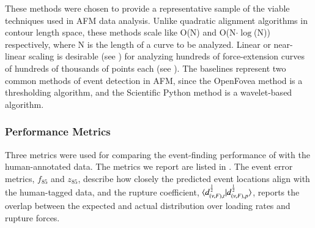  These methods were chosen to provide a representative sample of the viable techniques used in AFM data analysis. Unlike quadratic alignment algorithms in contour length space, these methods scale like O(N) and O(N$\cdot\log$(N)) respectively, where N is the length of a curve to be analyzed. Linear or near-linear scaling is desirable (see ) for analyzing hundreds of force-extension curves of hundreds of thousands of points each (see ). The baselines represent two common methods of event detection in AFM, since the OpenFovea method is a thresholding algorithm, and the Scientific Python method is a wavelet-based algorithm. \pl

\subsubsection{Performance Metrics}

\firstp Three metrics were used for comparing the event-finding performance of \name{} with the human-annotated data. The metrics we report are listed in . The event error metrics, $f_{85}$ and $z_{85}$, describe how closely the predicted event locations align with the human-tagged data, and the rupture \bc{} coefficient, $\braket{d_{(\nu,F),t}^{\frac{1}{2}}|d_{(\nu,F),p}^{\frac{1}{2}}}$, reports the overlap between the expected and actual distribution over loading rates and rupture forces. \pl


